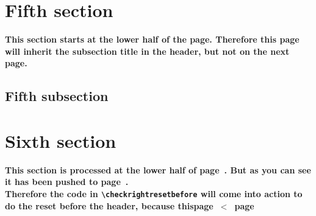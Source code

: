 \documentclass{article}
\begin{document}
\lipsum[8-11]

\section{Fifth section}

\textbf{This section starts at the lower half of the page. Therefore this page will inherit the subsection title in the header, but not on the next page.}

\medskip

\lipsum[1-7]

\subsection{Fifth subsection}

\lipsum[8-16]

\section{Sixth section}
\label{sec:push}

{\bfseries This section is processed at the lower half of  page~\thethispage. But as you can see it has been pushed to page~\pageref{sec:push}.\\
Therefore the code in \verb|\checkrightresetbefore| will come into action to do the reset before the header, because \mbox{thispage $<$ page}}

\medskip

\lipsum[1-6]
\end{document}
